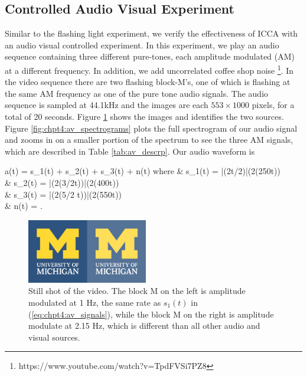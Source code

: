\subsection{Controlled Audio Visual Experiment}

Similar to the flashing light experiment, we verify the effectiveness of ICCA with an
audio visual controlled experiment. In this experiment, we play an audio sequence
containing three different pure-tones, each amplitude modulated (AM) at a different
frequency. In addition, we add uncorrelated coffee shop noise
\footnote{https://www.youtube.com/watch?v=TpdFVSi7PZ8}. In the video sequence there
are two flashing block-M's, one of which is flashing at the same AM frequency as one of
the pure tone audio signals.  The audio sequence is sampled at 44.1kHz and the images are
each $553\times1000$ pixels, for a total of 20 seconds. Figure \ref{fig:chpt4:av_scene} shows
the images and identifies the two  sources. Figure \ref{fig:chpt4:av_spectrograms} plots the
full spectrogram of our audio signal and zooms in on a smaller portion of the spectrum to
see the three AM signals, which are described in Table \ref{tab:av_descrp}. Our audio
waveform is

\beq\label{eq:chpt4_av_total}
a(t) = s_1(t) + s_2(t) + s_3(t) + n(t)
\eeq
where 
\beq\label{eq:chpt4:av_signals}\ba
& s_1(t) = |\sin(2\pi t/2)|\sin\left(2\pi\left(250t\right)\right)\\
& s_2(t) = |\cos(2\pi (3/2t))|\sin\left(2\pi\left(400t\right)\right)\\
& s_3(t) = |\cos(2\pi (5/2 t))|\sin\left(2\pi\left(550t\right)\right)\\
& n(t) = . \\
\ea\eeq

\begin{figure}
  \centering
  \includegraphics[width=0.47\textwidth]{chpt4_det_corr/figs/av_video.png}
  \caption{Still shot of the video. The block M on the left is amplitude modulated at 1
    Hz, the same rate as $s_1(t)$ in (\ref{eq:chpt4:av_signals}), while the block M on the
    right is amplitude modulate at 2.15 Hz, which is different than all other audio and
    visual sources.}
  \label{fig:chpt4:av_scene}
\end{figure}

